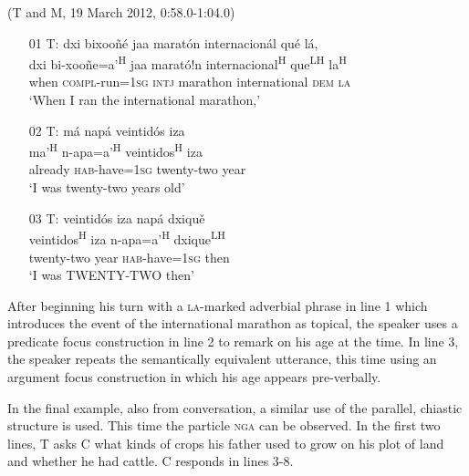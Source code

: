 \ea (T and M, 19 March 2012, 0:58.0-1:04.0)
\begin{itemize}

\item[01 T:] 
\glll dxi bixoo\~{n}\'{e} jaa marat\'{o}n internacion\'{a}l qu\'{e} l\'{a}, \\
dxi bi-xoo\~{n}e=a'\textsuperscript{H} jaa marat\'{o}!n internacional\textsuperscript{H} que\textsuperscript{LH} la\textsuperscript{H} \\
when \textsc{compl}-run=\textsc{1sg} \textsc{intj} marathon international \textsc{dem} \textsc{la} \\
\glt `When I ran the international marathon,'


\item[02 T:] 
\glll m\'{a} nap\'{a} veintid\'{o}s iza \\
 ma'\textsuperscript{H} n-apa=a'\textsuperscript{H} veintidos\textsuperscript{H} iza \\
already \textsc{hab}-have=\textsc{1sg} twenty-two year \\
\glt `I was twenty-two years old' 


\item[03 T:] 
\glll veintid\'{o}s iza nap\'{a} dxiqu\v{e} \\
veintidos\textsuperscript{H} iza n-apa=a'\textsuperscript{H} dxique\textsuperscript{LH} \\
twenty-two year \textsc{hab}-have=\textsc{1sg} then \\
\glt `I was TWENTY-TWO then' 


\end{itemize}
\z

After beginning his turn with a \textsc{la}-marked adverbial phrase in line 1 which introduces the event of the international marathon as topical, the speaker uses a predicate focus construction in line 2 to remark on his age at the time. In line 3, the speaker repeats the semantically equivalent utterance, this time using an argument focus construction in which his age appears pre-verbally. 


In the final example, also from conversation, a similar use of the parallel, chiastic structure is used. This time the particle \textsc{nga} can be observed. In the first two lines, T asks C what kinds of crops his father used to grow on his plot of land and whether he had cattle. C responds in lines 3-8.

